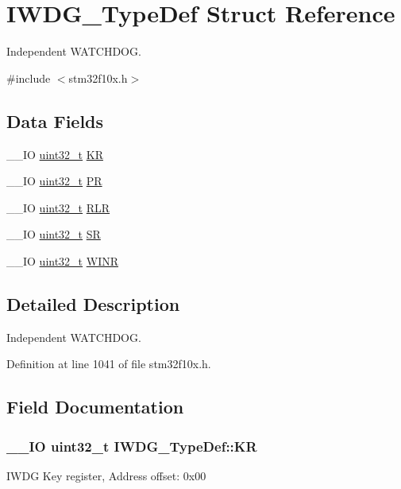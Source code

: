 \hypertarget{struct_i_w_d_g___type_def}{\section{I\-W\-D\-G\-\_\-\-Type\-Def Struct Reference}
\label{struct_i_w_d_g___type_def}
}


Independent W\-A\-T\-C\-H\-D\-O\-G.  




{\ttfamily \#include $<$stm32f10x.\-h$>$}

\subsection*{Data Fields}
\begin{DoxyCompactItemize}
\item 
\-\_\-\-\_\-\-I\-O \hyperlink{stdint_8h_a435d1572bf3f880d55459d9805097f62}{uint32\-\_\-t} \hyperlink{struct_i_w_d_g___type_def_a63089aaa5f4ad34ee2677ebcdee49cd9}{K\-R}
\item 
\-\_\-\-\_\-\-I\-O \hyperlink{stdint_8h_a435d1572bf3f880d55459d9805097f62}{uint32\-\_\-t} \hyperlink{struct_i_w_d_g___type_def_a5f2717885ff171e686e0347af9e6b68d}{P\-R}
\item 
\-\_\-\-\_\-\-I\-O \hyperlink{stdint_8h_a435d1572bf3f880d55459d9805097f62}{uint32\-\_\-t} \hyperlink{struct_i_w_d_g___type_def_aa3703eaa40e447dcacc69c0827595532}{R\-L\-R}
\item 
\-\_\-\-\_\-\-I\-O \hyperlink{stdint_8h_a435d1572bf3f880d55459d9805097f62}{uint32\-\_\-t} \hyperlink{struct_i_w_d_g___type_def_a9bbfbe921f2acfaf58251849bd0a511c}{S\-R}
\item 
\-\_\-\-\_\-\-I\-O \hyperlink{stdint_8h_a435d1572bf3f880d55459d9805097f62}{uint32\-\_\-t} \hyperlink{struct_i_w_d_g___type_def_a88aff7f1de0043ecf1667bd40b8c99d1}{W\-I\-N\-R}
\end{DoxyCompactItemize}


\subsection{Detailed Description}
Independent W\-A\-T\-C\-H\-D\-O\-G. 

Definition at line 1041 of file stm32f10x.\-h.



\subsection{Field Documentation}
\hypertarget{struct_i_w_d_g___type_def_a63089aaa5f4ad34ee2677ebcdee49cd9}{
\subsubsection[{K\-R}]{\setlength{\rightskip}{0pt plus 5cm}\-\_\-\-\_\-\-I\-O {\bf uint32\-\_\-t} I\-W\-D\-G\-\_\-\-Type\-Def\-::\-K\-R}}\label{struct_i_w_d_g___type_def_a63089aaa5f4ad34ee2677ebcdee49cd9}
I\-W\-D\-G Key register, Address offset\-: 0x00 

